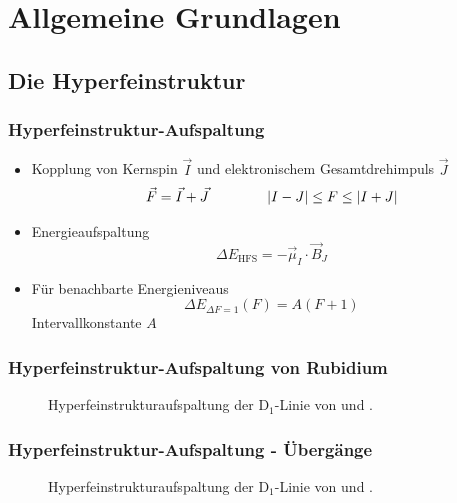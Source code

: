 
\section{Allgemeine Grundlagen}

\subsection{Die Hyperfeinstruktur}

\begin{frame}
\frametitle{Hyperfeinstruktur-Aufspaltung}
\begin{itemize}
    \item<1-> Kopplung von Kernspin $\vec{I}$ und elektronischem Gesamtdrehimpuls $\vec{J}$
    \begin{equation*}
        \vec{F} = \vec{I} + \vec{J} \qquad \qquad \left|I - J\right| \leq F \leq \left|I + J\right|
    \end{equation*}
    \item<2-> Energieaufspaltung
    \begin{equation*}
        \Delta E_\text{HFS} = - \vec{\mu}_I \cdot \vec{B}_J
    \end{equation*}
    \item<3-> Für benachbarte Energieniveaus
    \begin{equation*}
        \Delta E_{\Delta F = 1} (F) = A(F+1)
    \end{equation*}
    Intervallkonstante $A$
\end{itemize}
\end{frame}


\begin{frame}
\frametitle{Hyperfeinstruktur-Aufspaltung von Rubidium}

\begin{figure}
    \centering
    \def\svgwidth{\textwidth}
    
    \caption{Hyperfeinstrukturaufspaltung der D$_1$-Linie von  und .}
\end{figure}
\end{frame}


\begin{frame}
\frametitle{Hyperfeinstruktur-Aufspaltung - Übergänge}

\begin{figure}
    \centering
    \def\svgwidth{\textwidth}
    
    \caption{Hyperfeinstrukturaufspaltung der D$_1$-Linie von 
     und .}
\end{figure}
\end{frame}

